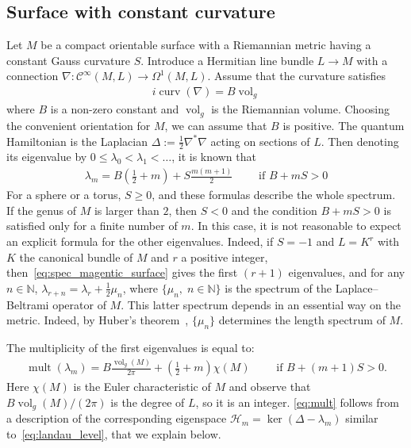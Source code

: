 \documentclass[10pt,a4paper]{article}
\theoremstyle{definition}
\numberwithin{equation}{section}
\newcommand{\N}{{\mathbb{N}}}
\newcommand{\la}{{\lambda}}
\newcommand{\Om}{\Omega}
\newcommand{\op}{\operatorname}
\newcommand{\Ci}{{\mathcal{C}}^{\infty}}
\newcommand{\Hilb}{\mathcal{H}}
\begin{document}
\subsection*{Surface with constant curvature~\cite{IeLi94, Te06}}
Let $M$ be a compact orientable surface with a Riemannian metric having a constant Gauss curvature $S$. Introduce a Hermitian line bundle $ L
\rightarrow M$ with a connection $\nabla : \Ci (M, L) \rightarrow \Om^1 (M,L)$. Assume that the curvature satisfies
\begin{gather}\label{eq:constant_magnetic}
i \op{curv} (\nabla) = B
\op{vol}_g
\end{gather}
where $B$ is a non-zero constant and $\op{vol}_g$ is the Riemannian volume. Choosing the convenient orientation for $M$, we can assume that $B$ is positive. The quantum Hamiltonian is the Laplacian $ \Delta := \frac{1}{2} \nabla^* \nabla $ acting on sections of $L$. Then denoting its eigenvalue by $0 \leqslant \la_0 < \la_1 <
\ldots $, it is known that
\begin{gather}\label{eq:spec_magentic_surface}
\la_m = B \left(\tfrac{1}{2} + m\right) + S \tfrac{ m (m+1)}{2} \qquad \text{ if } B + m S >0
\end{gather}
For a sphere or a torus, $S \geqslant 0$, and these formulas describe the whole spectrum. If the genus of $M$ is larger than $2$, then $S<0$ and the condition $B + m S >0$ is satisfied only for a finite number of $m$. In this case, it is not reasonable to expect an explicit formula for the other eigenvalues. Indeed, if $S=-1$ and $L = K^r$ with $K$ the canonical bundle of $M$ and $r$ a positive integer, then~\eqref{eq:spec_magentic_surface} gives the first $(r+1)$ eigenvalues, and for any $n \in \N$, $\la_{r+n} = \la_r + \tfrac{1}{2} \mu_n$, where $\{\mu_n, \; n
\in \N\}$ is the spectrum of the Laplace--Beltrami operator of $M$. This latter spectrum depends in an essential way on the metric. Indeed, by Huber's theorem~\cite[Theorem~9.2.9]{Buser}, $\{ \mu_n\}$ determines the length spectrum of $M$.

The multiplicity of the first eigenvalues is equal to:
\begin{gather}\label{eq:mult}
\op{mult} (\la_m) = B \frac{ \op{vol}_g (M)}{2\pi} + \left(\tfrac{1}{2} + m\right)
\chi (M) \qquad \text{ if } B + (m+1)S >0.
\end{gather}
Here $\chi (M)$ is the Euler characteristic of $M$ and observe that $B
\op{vol}_g (M) / (2\pi)$ is the degree of $L$, so it is an integer. \eqref{eq:mult} follows from a description of the corresponding eigenspace $\Hilb_m = \ker (\Delta -
\la_m)$ similar to~\eqref{eq:landau_level}, that we explain below.
\end{document}
